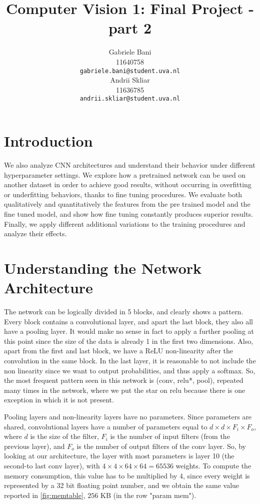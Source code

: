 \documentclass{article}
\title{Computer Vision 1: Final Project - part 2}
\author{
	Gabriele Bani \\
	11640758 \\
  \texttt{gabriele.bani@student.uva.nl} \\
  \And
  	Andrii Skliar \\
  11636785 \\
  \texttt{andrii.skliar@student.uva.nl} \\
}
\begin{document}
\maketitle

\section{Introduction}

We also analyze CNN architectures and understand their behavior under different hyperparameter settings. We explore how a pretrained network can be used on another dataset in order to achieve good results, without occurring in overfitting or underfitting behaviors, thanks to fine tuning procedures. We evaluate both qualitatively and quantitatively the features from the pre trained model and the fine tuned model, and show how fine tuning constantly produces superior results. Finally, we apply different additional variations to the training procedures and analyze their effects.  

\section{Understanding the Network Architecture}



The network can be logically divided in 5 blocks, and clearly shows a pattern. Every block contains a convolutional layer, and apart the last block, they also all have a pooling layer. It would make no sense in fact to apply a further pooling at this point since the size of the data is already 1 in the first two dimensions. 
Also, apart from the first and last block, we have a ReLU non-linearity after the convolution in the same block. In the last layer, it is reasonable to not include the non linearity since we want to output probabilities, and thus apply a softmax. So, the most frequent pattern seen in this network is (conv, relu*, pool), repeated many times in the network, where we put the star on relu because there is one exception in which it is not present.


Pooling layers and non-linearity layers have no parameters. Since parameters are shared, convolutional layers have a number of parameters equal to $d \times d \times F_i \times F_o$, where $d$ is the size of the filter, $F_i$ is the number of input filters (from the previous layer), and $F_o$ is the number of output filters of the conv layer. So, by looking at our architecture, the layer with most parameters is layer 10 (the second-to last conv layer), with $4 \times 4 \times 64 \times 64 = 65536$ weights. To compute the memory consumption, this value has to be multiplied by 4, since every weight is represented by a 32 bit floating point number, and we obtain the same value reported in \cref{fig:memtable}, $256$ KB (in the row "param mem"). 
\end{document}
